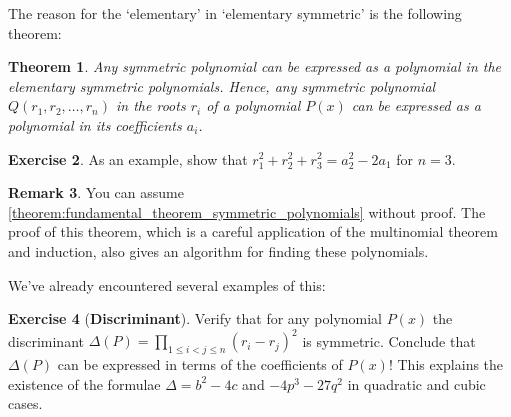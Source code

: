 \documentclass[reqno, 12pt, letter]{article}
\theoremstyle{plain}
\newtheorem{theorem}{Theorem}[section]
\theoremstyle{definition}
\newtheorem{definition}[theorem]{Definition}
\newtheorem{remark}[theorem]{Remark}
\newtheorem{exercise}[theorem]{Exercise}
\theoremstyle{remark}
\numberwithin{equation}{section}
\begin{document}
%
The reason for the `elementary' in `elementary symmetric' is the following theorem:
\begin{theorem}
	\label{theorem:fundamental_theorem_symmetric_polynomials}
	Any symmetric polynomial can be expressed as a polynomial in the elementary symmetric polynomials.
	Hence, any symmetric polynomial $ Q(r_1, r_2, \dots, r_n)$ in the roots $ r_i$ of a polynomial $ P(x)$ can be expressed as a polynomial in its coefficients $ a_i$.
\end{theorem}
\begin{exercise}
	As an example, show that $ r_1^2 + r_2^2 + r_3^2  = a_2^2 - 2 a_1$ for $ n=3$.
\end{exercise}
\begin{remark}
	You can assume \autoref{theorem:fundamental_theorem_symmetric_polynomials} without proof. The proof of this theorem, which is a careful application of the multinomial theorem and induction, also gives an algorithm for finding these polynomials.
\end{remark}

We've already encountered several examples of this:
\begin{exercise}[\textbf{Discriminant}]
	Verify that for any polynomial $ P(x)$ the discriminant $\Delta(P) = \prod_{1 \leq i < j \leq n} (r_i - r_j)^2$ is symmetric. Conclude that $\Delta(P)$ can be expressed in terms of the coefficients of $ P(x)$! This explains the existence of the formulae $\Delta = b^2 - 4c$ and $-4p^3 - 27q^2$ in quadratic and cubic cases.
\end{exercise}
\end{document}
